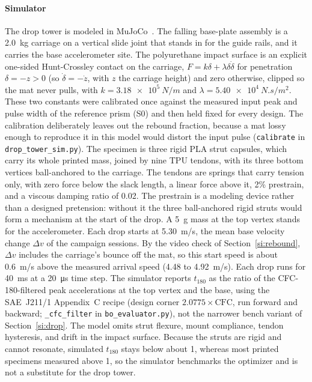 \documentclass[11pt]{article}
\begin{document}
\paragraph{Simulator} The drop tower is modeled in
MuJoCo~\cite{todorov2012mujoco}. The falling base-plate assembly is a
\SI{2.0}{kg} carriage on a vertical slide joint that stands in for the
guide rails, and it carries the base accelerometer site. The
polyurethane impact surface is an explicit one-sided Hunt-Crossley
contact on the carriage, $F = k\delta + \lambda\delta\dot{\delta}$
for penetration $\delta = -z > 0$ (so $\dot{\delta} = -\dot{z}$, with $z$
the carriage height) and zero otherwise, clipped so the mat never pulls, with
$k = \SI{3.18e5}{N/m}$ and $\lambda = \SI{5.40e4}{N.s/m^2}$. These two
constants were calibrated once against the measured input peak and
pulse width of the reference prism (S0) and then held fixed for every
design. The calibration deliberately leaves out the rebound fraction,
because a mat lossy enough to reproduce it in this model would distort
the input pulse (\texttt{calibrate} in \texttt{drop\_tower\_sim.py}). The specimen is three rigid PLA strut capsules, which carry
its whole printed mass, joined by nine TPU tendons, with its three
bottom vertices ball-anchored to the carriage. The tendons are springs
that carry tension only, with zero force below the slack length, a
linear force above it, 2\% prestrain, and a viscous damping ratio of
0.02. The prestrain is a modeling device rather than a designed
pretension: without it the three ball-anchored rigid struts would form a
mechanism at the start of the drop. A \SI{5}{g} mass at the top vertex
stands for the accelerometer. Each drop starts at \SI{5.30}{m/s}, the
mean base velocity change $\Delta v$ of the campaign sessions. By the
video check of Section~\ref{si:rebound}, $\Delta v$ includes the
carriage's bounce off the mat, so this start speed is about
\SI{0.6}{m/s} above the measured arrival speed (4.48 to
\SI{4.92}{m/s}). Each drop runs for
\SI{40}{ms} at a \SI{20}{\micro s} time step. The simulator reports
$t_{180}$ as the ratio of the CFC-180-filtered peak accelerations at
the top vertex and the base, using the SAE~J211/1 Appendix~C recipe
(design corner $2.0775 \times \mathrm{CFC}$, run forward and backward;
\texttt{\_cfc\_filter} in \texttt{bo\_evaluator.py}), not the narrower
bench variant of Section~\ref{si:drop}. The model omits strut flexure, mount compliance, tendon
hysteresis, and drift in the impact surface. Because the struts are
rigid and cannot resonate, simulated $t_{180}$ stays below about 1,
whereas most printed specimens measured above 1, so the simulator
benchmarks the optimizer and is not a substitute for the drop tower.
\end{document}
